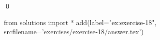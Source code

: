 
\begin{ex} 
  \label{ex:exercise-18}
  
  \qed
\end{ex} 
\begin{python0}
from solutions import *
add(label="ex:exercise-18",
    srcfilename='exercises/exercise-18/answer.tex') 
\end{python0}
